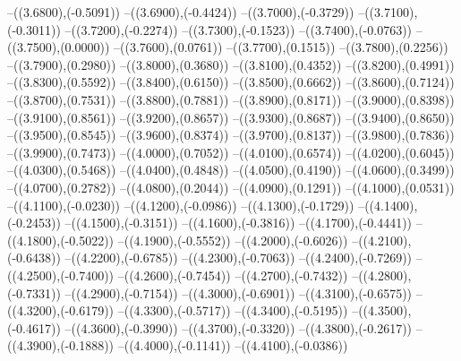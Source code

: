 {	--({\sx*(3.6800)},{\sy*(-0.5091)})
	--({\sx*(3.6900)},{\sy*(-0.4424)})
	--({\sx*(3.7000)},{\sy*(-0.3729)})
	--({\sx*(3.7100)},{\sy*(-0.3011)})
	--({\sx*(3.7200)},{\sy*(-0.2274)})
	--({\sx*(3.7300)},{\sy*(-0.1523)})
	--({\sx*(3.7400)},{\sy*(-0.0763)})
	--({\sx*(3.7500)},{\sy*(0.0000)})
	--({\sx*(3.7600)},{\sy*(0.0761)})
	--({\sx*(3.7700)},{\sy*(0.1515)})
	--({\sx*(3.7800)},{\sy*(0.2256)})
	--({\sx*(3.7900)},{\sy*(0.2980)})
	--({\sx*(3.8000)},{\sy*(0.3680)})
	--({\sx*(3.8100)},{\sy*(0.4352)})
	--({\sx*(3.8200)},{\sy*(0.4991)})
	--({\sx*(3.8300)},{\sy*(0.5592)})
	--({\sx*(3.8400)},{\sy*(0.6150)})
	--({\sx*(3.8500)},{\sy*(0.6662)})
	--({\sx*(3.8600)},{\sy*(0.7124)})
	--({\sx*(3.8700)},{\sy*(0.7531)})
	--({\sx*(3.8800)},{\sy*(0.7881)})
	--({\sx*(3.8900)},{\sy*(0.8171)})
	--({\sx*(3.9000)},{\sy*(0.8398)})
	--({\sx*(3.9100)},{\sy*(0.8561)})
	--({\sx*(3.9200)},{\sy*(0.8657)})
	--({\sx*(3.9300)},{\sy*(0.8687)})
	--({\sx*(3.9400)},{\sy*(0.8650)})
	--({\sx*(3.9500)},{\sy*(0.8545)})
	--({\sx*(3.9600)},{\sy*(0.8374)})
	--({\sx*(3.9700)},{\sy*(0.8137)})
	--({\sx*(3.9800)},{\sy*(0.7836)})
	--({\sx*(3.9900)},{\sy*(0.7473)})
	--({\sx*(4.0000)},{\sy*(0.7052)})
	--({\sx*(4.0100)},{\sy*(0.6574)})
	--({\sx*(4.0200)},{\sy*(0.6045)})
	--({\sx*(4.0300)},{\sy*(0.5468)})
	--({\sx*(4.0400)},{\sy*(0.4848)})
	--({\sx*(4.0500)},{\sy*(0.4190)})
	--({\sx*(4.0600)},{\sy*(0.3499)})
	--({\sx*(4.0700)},{\sy*(0.2782)})
	--({\sx*(4.0800)},{\sy*(0.2044)})
	--({\sx*(4.0900)},{\sy*(0.1291)})
	--({\sx*(4.1000)},{\sy*(0.0531)})
	--({\sx*(4.1100)},{\sy*(-0.0230)})
	--({\sx*(4.1200)},{\sy*(-0.0986)})
	--({\sx*(4.1300)},{\sy*(-0.1729)})
	--({\sx*(4.1400)},{\sy*(-0.2453)})
	--({\sx*(4.1500)},{\sy*(-0.3151)})
	--({\sx*(4.1600)},{\sy*(-0.3816)})
	--({\sx*(4.1700)},{\sy*(-0.4441)})
	--({\sx*(4.1800)},{\sy*(-0.5022)})
	--({\sx*(4.1900)},{\sy*(-0.5552)})
	--({\sx*(4.2000)},{\sy*(-0.6026)})
	--({\sx*(4.2100)},{\sy*(-0.6438)})
	--({\sx*(4.2200)},{\sy*(-0.6785)})
	--({\sx*(4.2300)},{\sy*(-0.7063)})
	--({\sx*(4.2400)},{\sy*(-0.7269)})
	--({\sx*(4.2500)},{\sy*(-0.7400)})
	--({\sx*(4.2600)},{\sy*(-0.7454)})
	--({\sx*(4.2700)},{\sy*(-0.7432)})
	--({\sx*(4.2800)},{\sy*(-0.7331)})
	--({\sx*(4.2900)},{\sy*(-0.7154)})
	--({\sx*(4.3000)},{\sy*(-0.6901)})
	--({\sx*(4.3100)},{\sy*(-0.6575)})
	--({\sx*(4.3200)},{\sy*(-0.6179)})
	--({\sx*(4.3300)},{\sy*(-0.5717)})
	--({\sx*(4.3400)},{\sy*(-0.5195)})
	--({\sx*(4.3500)},{\sy*(-0.4617)})
	--({\sx*(4.3600)},{\sy*(-0.3990)})
	--({\sx*(4.3700)},{\sy*(-0.3320)})
	--({\sx*(4.3800)},{\sy*(-0.2617)})
	--({\sx*(4.3900)},{\sy*(-0.1888)})
	--({\sx*(4.4000)},{\sy*(-0.1141)})
	--({\sx*(4.4100)},{\sy*(-0.0386)})
}
